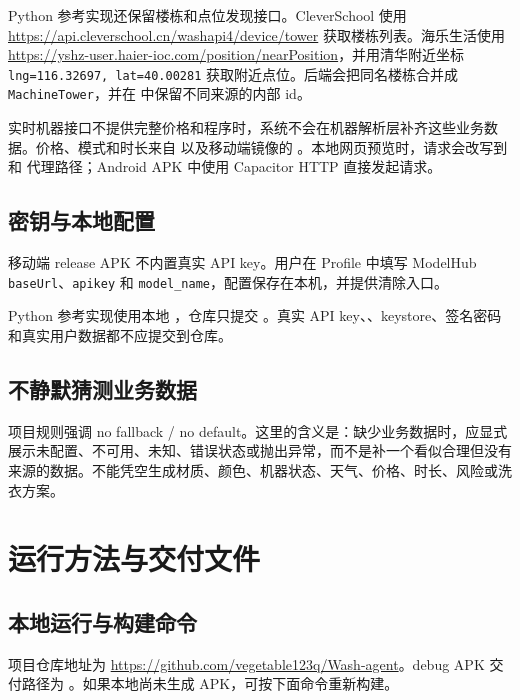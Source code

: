 \documentclass[11pt,a4paper]{ctexart}
\begin{document}
Python 参考实现还保留楼栋和点位发现接口。CleverSchool 使用 \url{https://api.cleverschool.cn/washapi4/device/tower} 获取楼栋列表。海乐生活使用 \url{https://yshz-user.haier-ioc.com/position/nearPosition}，并用清华附近坐标 \texttt{lng=116.32697, lat=40.00281} 获取附近点位。后端会把同名楼栋合并成 \texttt{MachineTower}，并在  中保留不同来源的内部 id。

实时机器接口不提供完整价格和程序时，系统不会在机器解析层补齐这些业务数据。价格、模式和时长来自  以及移动端镜像的 。本地网页预览时，请求会改写到  和  代理路径；Android APK 中使用 Capacitor HTTP 直接发起请求。

\subsection{密钥与本地配置}

移动端 release APK 不内置真实 API key。用户在 Profile 中填写 ModelHub \texttt{baseUrl}、\texttt{apikey} 和 \texttt{model\_name}，配置保存在本机，并提供清除入口。

Python 参考实现使用本地 ，仓库只提交 。真实 API key、、keystore、签名密码和真实用户数据都不应提交到仓库。

\subsection{不静默猜测业务数据}

项目规则强调 no fallback / no default。这里的含义是：缺少业务数据时，应显式展示未配置、不可用、未知、错误状态或抛出异常，而不是补一个看似合理但没有来源的数据。不能凭空生成材质、颜色、机器状态、天气、价格、时长、风险或洗衣方案。

\section{运行方法与交付文件}

\subsection{本地运行与构建命令}

项目仓库地址为 \url{https://github.com/vegetable123q/Wash-agent}。debug APK 交付路径为 。如果本地尚未生成 APK，可按下面命令重新构建。
\end{document}

